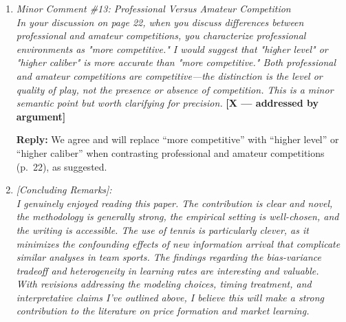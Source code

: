 \documentclass[letterpaper,12pt]{article}
\newcounter{b}
\newcommand{\argX}{\textcolor{green!55!black}{\textbf{[X --- addressed by argument]}}}
\newcommand{\Reply}[1]{\par\noindent\textbf{Reply:} #1}
\begin{document}
\begin{enumerate}
\Reply{This is a valuable interpretive point. In principle, a low learning rate could reflect either (i) a market that is slow to correct meaningful mispricing, or (ii) a market that is already close to efficient at opening, so little further adjustment is needed. Our cross-sectional evidence is more consistent with interpretation~(i) than~(ii): we find a \emph{negative} correlation between bookmaker-specific learning rates and opening-price RMSE (Section~5.5), i.e., bookmakers with \emph{more} accurate opening prices tend to have \emph{higher}, not lower, learning rates -- the opposite of what we would expect if low learning rates simply reflected pre-existing efficiency. Similarly, longshots -- for whom the favorite-longshot bias documented in the sports-betting literature (e.g., Thaler and Ziemba, 1988) implies systematically less accurate opening prices -- also exhibit lower, not higher, learning rates in our data (Section~5.5), again suggesting that low learning rates coincide with greater initial inaccuracy rather than substituting for it. We will add this argument explicitly to Section~6 to address the referee's concern.}

\item \textit{Minor Comment \#13: Professional Versus Amateur Competition\\[6pt]
In your discussion on page 22, when you discuss differences between professional and amateur competitions, you characterize professional environments as "more competitive." I would suggest that "higher level" or "higher caliber" is more accurate than "more competitive." Both professional and amateur competitions are competitive—the distinction is the level or quality of play, not the presence or absence of competition. This is a minor semantic point but worth clarifying for precision.} \argX

\Reply{We agree and will replace ``more competitive'' with ``higher level'' or ``higher caliber'' when contrasting professional and amateur competitions (p.~22), as suggested.}

\item \textit{[Concluding Remarks]:\\[6pt]
I genuinely enjoyed reading this paper. The contribution is clear and novel, the methodology is generally strong, the empirical setting is well-chosen, and the writing is accessible. The use of tennis is particularly clever, as it minimizes the confounding effects of new information arrival that complicate similar analyses in team sports. The findings regarding the bias-variance tradeoff and heterogeneity in learning rates are interesting and valuable.\\[6pt]
With revisions addressing the modeling choices, timing treatment, and interpretative claims I've outlined above, I believe this will make a strong contribution to the literature on price formation and market learning.}

\end{enumerate}
\newpage
\end{document}
